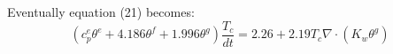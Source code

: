 Eventually equation (21) becomes:
\begin{equation}
(c_p^e \theta^e + 4.186 \theta^f + 1.996 \theta^g) \frac{T_c}{dt} = 2.26 + 2.19 T_c \nabla \cdot ( K_w  \theta^g)
\end{equation}